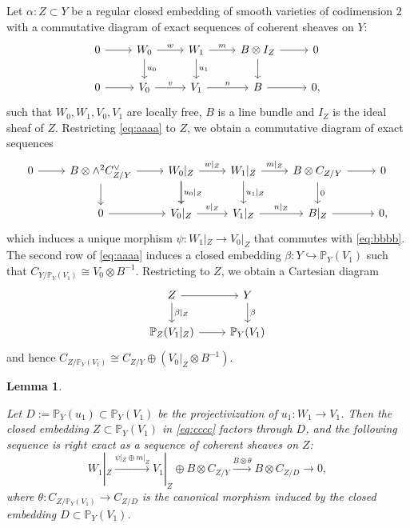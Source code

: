 \documentclass{amsart}
\numberwithin{equation}{section}
\newcommand\mb{\mathbb}
\newtheorem{lemma}[theorem]{Lemma}
\theoremstyle{definition}
\theoremstyle{remark}
\begin{document}
Let $\alpha:Z\subset Y$ be a regular closed embedding of smooth varieties of codimension $2$ with a commutative diagram of exact sequences of coherent sheaves on $Y$:
 \begin{equation}
  \label{eq:aaaa}
  \begin{tikzcd}
    0 \ar{r} & W_0 \ar{r}{w} \ar{d}{u_0} & W_1 \ar{r}{m} \ar{d}{u_1} & B\otimes I_{Z} \ar{d}\ar{r} & 0\\
    0 \ar{r} & V_0 \ar{r}{v} & V_1 \ar{r}{n} & B \ar{r} & 0,
  \end{tikzcd}
\end{equation}
such that $W_0,W_1,V_0,V_1$ are locally free, $B$ is a line bundle and $I_Z$ is the ideal sheaf of $Z$.
Restricting \cref{eq:aaaa} to $Z$, we obtain a commutative diagram of exact sequences
\begin{equation}
  \label{eq:bbbb}
  \begin{tikzcd}
  0  \ar{r} & B\otimes \wedge^2 C_{Z/Y}^{\vee} \ar{d} \ar{r}& \ar{d} W_0|_{Z} \ar{r}{w|_{Z}} \ar{d}{u_0|_{Z}} & W_1|_{Z} \ar{r}{m|_Z} \ar{d}{u_1|_{Z}} & B\otimes C_{Z/Y} \ar{r} \ar{d}{0} & 0\\
    & 0 \ar{r} & V_0|_{Z} \ar{r}{v|_{Z}} & V_1|_{Z} \ar{r}{n|_Z} & B|_{Z} \ar{r} & 0,
  \end{tikzcd}
\end{equation}
which induces a unique morphism $\psi: W_1|_{Z}\to V_0|_{Z}$ that commutes with \cref{eq:bbbb}. The second row of \cref{eq:aaaa} induces a closed embedding $\beta:Y\hookrightarrow \mb{P}_Y(V_1)$ such that $C_{Y/\mb{P}_Y(V_1)}\cong V_0\otimes B^{-1}$. Restricting to $Z$, we obtain a Cartesian diagram
\begin{equation}
  \label{eq:cccc}
  \begin{tikzcd}
    Z \ar{r} \ar{d}{\beta|_Z} & Y \ar{d}{\beta}\\
    \mb{P}_Z(V_1|_Z) \ar{r} & \mb{P}_Y(V_1)
  \end{tikzcd}
\end{equation}
and hence $C_{Z/\mb{P}_Y(V_1)}\cong C_{Z/Y}\oplus (V_0|_Z\otimes B^{-1})$.
\begin{lemma}
\label{lemmaA}
  
  Let $D:=\mb{P}_Y(u_1)\subset \mb{P}_Y(V_1)$ be the projectivization of $u_1:W_1\to V_1$. Then the closed embedding $Z\subset \mb{P}_Y(V_1)$ in \cref{eq:cccc} factors through $D$, and the following sequence is right exact as a sequence of coherent sheaves on $Z$:
  \begin{equation}
    \label{eq:dddd}
    W_1|_{Z}\xrightarrow{\psi|_Z\oplus m|_Z} V_1|_{Z}\oplus B\otimes C_{Z/Y}\xrightarrow{B\otimes \theta} B\otimes C_{Z/D}\to 0,
  \end{equation}
  where $\theta:C_{Z/\mb{P}_Y(V_1)}\to C_{Z/D}$ is the canonical morphism induced by the closed embedding $D\subset \mb{P}_Y(V_1)$. 
\end{lemma}
\end{document}

